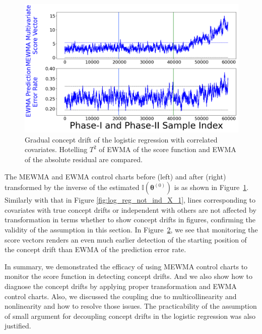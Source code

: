 \documentclass[twoside,11pt]{article}
\begin{document}
\begin{appendix}
\begin{figure}[!htbp]
  \label{fig:log_reg_not_ind_X_grad_cd}
\end{figure}
\begin{figure}[!htbp]
\centering
\includegraphics[width = 0.6\linewidth]{../figures/v14/sim_7/logi_small/1_sim7_logi_1e-08_0_005_1.png}
  \caption{Gradual concept drift of the logistic regression with correlated covariates. Hotelling $T^2$ of EWMA of the score function and EWMA of the absolute residual are compared.}
  \label{fig:log_reg_ind_X_grad_cd_comp}
\end{figure}

The MEWMA and EWMA control charts before (left) and after (right) transformed by {the inverse of the estimated} ${\mathbb {I}}(\bm { \theta}^{(0)})$ is as shown in Figure~\ref{fig:log_reg_not_ind_X_grad_cd}. Similarly with that in Figure \ref{fig:log_reg_not_ind_X_1}, lines corresponding to covariates with true concept drifts or independent with others are not affected by transformation in terms whether to show concept drifts in figures, confirming the validity of the assumption in this section. In Figure~\ref{fig:log_reg_ind_X_grad_cd_comp}, we see that monitoring the score vectors renders an even much earlier detection of the starting position of the concept drift than EWMA of the prediction error rate.

In summary, we demonstrated the efficacy of using MEWMA control charts to monitor the score function in detecting concept drifts. And we also show how to diagnose the concept drifts by applying proper transformation and EWMA control charts. Also, we discussed the coupling due to multicollinearity and nonlinearity and how to resolve those issues. The practicability of the assumption of small argument for decoupling concept drifts in the logistic regression was also justified.


\end{appendix}
\end{document}

